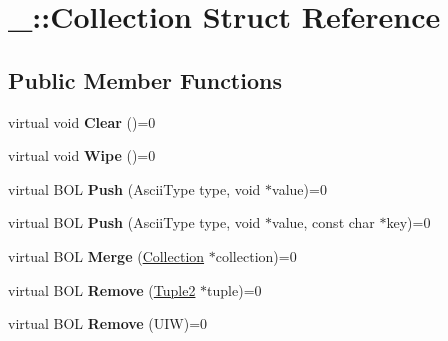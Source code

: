 \hypertarget{struct___1_1_collection}{}\section{\+\_\+\+:\+:Collection Struct Reference}
\label{struct___1_1_collection}
\subsection*{Public Member Functions}
\begin{DoxyCompactItemize}
\item 
\mbox{\label{struct___1_1_collection_a2e2a2a7a7ed399e787b55cb5a16278fd}} 
virtual void {\bfseries Clear} ()=0
\item 
\mbox{\label{struct___1_1_collection_a3575fe9c157fede5038dbef555e4dcf2}} 
virtual void {\bfseries Wipe} ()=0
\item 
\mbox{\label{struct___1_1_collection_a434f86ce2b04d22701fa642fe1c751c0}} 
virtual B\+OL {\bfseries Push} (Ascii\+Type type, void $\ast$value)=0
\item 
\mbox{\label{struct___1_1_collection_ab19089046a0a71466a670ffde06a1c90}} 
virtual B\+OL {\bfseries Push} (Ascii\+Type type, void $\ast$value, const char $\ast$key)=0
\item 
\mbox{\label{struct___1_1_collection_a2952c1b0f706475dc934f1ab77b68140}} 
virtual B\+OL {\bfseries Merge} (\mbox{\hyperlink{struct___1_1_collection}{Collection}} $\ast$collection)=0
\item 
\mbox{\label{struct___1_1_collection_ae3ff784577f8a2b216d8184e754b4130}} 
virtual B\+OL {\bfseries Remove} (\mbox{\hyperlink{struct___1_1_tuple2}{Tuple2}} $\ast$tuple)=0
\item 
\mbox{\label{struct___1_1_collection_af838f8aaed0c997fd641c8d0573d8f07}} 
virtual B\+OL {\bfseries Remove} (U\+IW)=0
\item 
\mbox{\label{struct___1_1_collection_a4a40d810a39178ce85ddb9a417a17925}} 

\end{DoxyCompactItemize}
